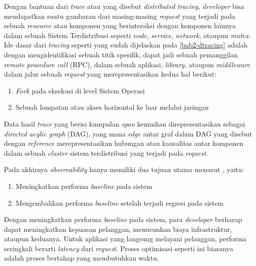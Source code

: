  
 Dengan bantuan dari \textit{trace} atau yang disebut \textit{distributed tracing}, \textit{developer} bisa mendapatkan suatu gambaran dari masing-masing \textit{request} yang terjadi pada sebuah \textit{resource} atau komponen yang berinteraksi dengan komponen lainnya dalam sebuah Sistem Terdistribusi seperti \textit{node}, \textit{service}, \textit{network}, ataupun \textit{mutex}. Ide dasar dari \textit{tracing} seperti yang sudah dijelaskan pada \ref{bab2-dtracing} adalah dengan mengidentifikasi sebuah titik spesifik, dapat jadi sebuah pemanggilan \textit{remote procedure call} (RPC), dalam sebuah aplikasi, \textit{library}, ataupun \textit{middleware} dalam jalur sebuah \textit{request} yang merepresentasikan kedua hal berikut:
 \begin{enumerate}
 \item \textit{Fork} pada eksekusi di level Sistem Operasi
 \item Sebuah lompatan atau akses horizontal ke luar melalui jaringan
\end{enumerate}

Data hasil \textit{trace} yang berisi kumpulan \textit{span} kemudian direpresentasikan sebagai \textit{directed acylic graph} (DAG), yang mana \textit{edge} antar graf dalam DAG yang disebut dengan \textit{reference} merepresentasikan hubungan atau kausalitas antar komponen dalam sebuah \textit{cluster} sistem terdistribusi yang terjadi pada \textit{request}. 

Pada akhirnya \textit{observability} hanya memiliki dua tujuan utama menurut \citep{parker2020distributed}, yaitu:
\begin{enumerate}
	\item Meningkatkan performa \textit{baseline} pada sistem
	\item Mengembalikan performa \textit{baseline} setelah terjadi regresi pada sistem
\end{enumerate}

Dengan meningkatkan performa \textit{baseline} pada sistem, para \textit{developer} berharap dapat meningkatkan kepuasan pelanggan, menurunkan biaya infrastruktur, ataupun keduanya. Untuk aplikasi yang langsung melayani pelanggan, performa seringkali berarti \textit{latency} dari \textit{request}. Proses optimisasi seperti ini biasanya adalah proses bertahap yang membutuhkan waktu.

